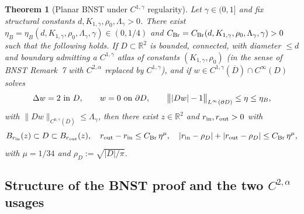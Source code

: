 \documentclass[11pt]{amsart}
\newtheorem{theorem}{Theorem}[section]
\newcommand{\R}{\mathbb R}
\begin{document}
\begin{theorem}[Planar BNST under $C^{1,\gamma}$ regularity]
\label{thm:BNST-Cgamma}
Let $\gamma\in(0,1]$ and fix structural constants $d, K_{1,\gamma},
\rho_0, \Lambda_\gamma>0$.  There exist
$\eta_B=\eta_B(d,K_{1,\gamma},\rho_0,\Lambda_\gamma,\gamma)\in(0,1/4)$
and $C_{\rm Br}=C_{\rm Br}(d,K_{1,\gamma},\rho_0,\Lambda_\gamma,
\gamma)>0$ such that the following holds.  If $D\subset\R^2$ is
bounded, connected, with diameter $\le d$ and boundary admitting a
$C^{1,\gamma}$ atlas of constants $(K_{1,\gamma},\rho_0)$
\textup{(in the sense of BNST Remark~7 with $C^{2,\alpha}$ replaced by
$C^{1,\gamma}$)}, and if $w\in C^{1,\gamma}(\overline D)\cap C^\infty(D)$
solves
\begin{equation}\label{eq:BNST-Cgamma-eq}
   \Delta w=2\ \hbox{in }D,\qquad w=0\ \hbox{on }\partial D,
   \qquad \bigl\||Dw|-1\bigr\|_{L^\infty(\partial D)}\le \eta\le\eta_B,
\end{equation}
with $\|Dw\|_{C^{0,\gamma}(\overline D)}\le\Lambda_\gamma$, then there
exist $z\in\R^2$ and $r_{\rm in},r_{\rm out}>0$ with
\begin{equation}\label{eq:BNST-Cgamma-concl}
   B_{r_{\rm in}}(z)\subset D\subset B_{r_{\rm out}}(z),\quad
   r_{\rm out}-r_{\rm in}\le C_{\rm Br}\,\eta^{\mu},\quad
   |r_{\rm in}-\rho_D|+|r_{\rm out}-\rho_D|\le C_{\rm Br}\,\eta^\mu,
\end{equation}
with $\mu=1/34$ and $\rho_D:=\sqrt{|D|/\pi}$.
\end{theorem}

\subsection{Structure of the BNST proof and the two
\texorpdfstring{$C^{2,\alpha}$}{C(2,alpha)} usages}\label{ss:BNST-anatomy}
\end{document}

